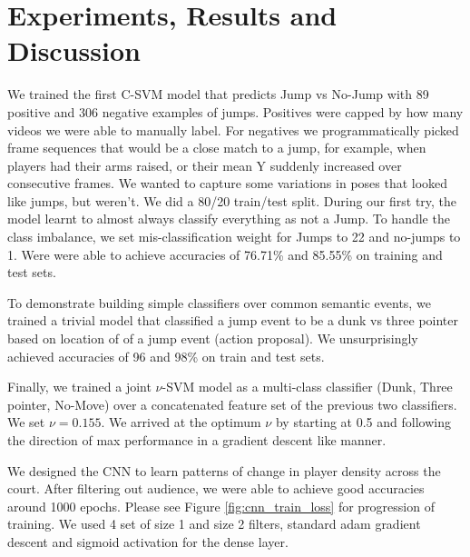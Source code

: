 \documentclass{article}
\begin{document}
\section{Experiments, Results and Discussion}
\label{methods}
We trained the first C-SVM model that predicts Jump vs No-Jump with 89 positive and 306 negative examples of jumps. Positives were capped by how many videos we were able to manually label. For negatives we programmatically picked frame sequences that would be a close match to a jump, for example, when players had their arms raised, or their mean Y suddenly increased over consecutive frames. We wanted to capture some variations in poses that looked like jumps, but weren't. We did a 80/20 train/test split. During our first try, the model learnt to almost always classify everything as not a Jump. To handle the class imbalance, we set mis-classification weight for Jumps to 22 and no-jumps to 1. Were were able to achieve accuracies of 76.71\% and 85.55\% on training and test sets.

To demonstrate building simple classifiers over common semantic events, we trained a trivial model that classified a jump event to be a dunk vs three pointer based on location of of a jump event (action proposal). We unsurprisingly achieved accuracies of 96 and 98\% on train and test sets.

Finally, we trained a joint $\nu$-SVM model as a multi-class classifier (Dunk, Three pointer, No-Move) over a concatenated feature set of the previous two classifiers. We set $\nu = 0.155$. We arrived at the optimum $\nu$ by starting at 0.5 and following the direction of max performance in a gradient descent like manner.

We designed the CNN to learn patterns of change in player density across the court. After filtering out audience, we were able to achieve good accuracies around 1000 epochs. Please see Figure \ref{fig:cnn_train_loss} for progression of  training. We used 4 set of size 1 and size 2 filters, standard adam gradient descent and sigmoid activation for the dense layer. 



\end{document}
